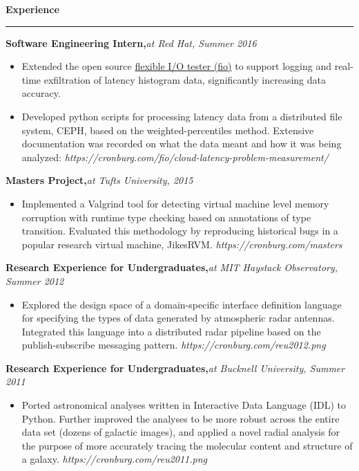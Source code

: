 \documentclass{article}
\begin{document}
{\large\bf Experience}\\[-.3cm]
\rule{\linewidth}{.5pt}
\begin{minipage}{\linewidth}
{\bf Software Engineering Intern,}{\it at Red Hat, Summer 2016}\\[-.4cm]
\begin{itemize}
\item Extended the open source \href{https://github.com/axboe/fio}{flexible I/O tester (fio)}
to support logging and real-time exfiltration of latency histogram data, significantly
increasing data accuracy.
\item Developed python scripts for processing latency data from a distributed
file system, CEPH, based on the weighted-percentiles method. Extensive documentation
was recorded on what the data meant and how it was being analyzed:
{\it https://cronburg.com/fio/cloud-latency-problem-measurement/}
\end{itemize}

{\bf Masters Project,}{\it at Tufts University, 2015}\\[-.4cm]
\begin{itemize}
\item Implemented a Valgrind tool for detecting virtual machine level memory
  corruption with runtime type checking based on annotations of type transition.
  Evaluated this methodology by reproducing historical bugs in a popular
  research virtual machine, JikesRVM. {\it https://cronburg.com/masters}
\end{itemize}

{\bf Research Experience for Undergraduates,}{\it at MIT Haystack Observatory, Summer 2012}\\[-.4cm]
\begin{itemize}
\item Explored the design space of a domain-specific interface definition language for
specifying the types of data generated by atmospheric radar antennas. Integrated this
language into a distributed radar pipeline based on the publish-subscribe messaging
pattern. {\it https://cronburg.com/reu2012.png}
\end{itemize}

{\bf Research Experience for Undergraduates,}{\it at Bucknell University, Summer 2011}\\[-.4cm]
\begin{itemize}
\item Ported astronomical analyses written in Interactive Data Language (IDL) to Python.
  Further improved the analyses to be more robust across the entire data set (dozens of
  galactic images), and applied a novel radial analysis for the purpose of more accurately
  tracing the molecular content and structure of a galaxy. {\it https://cronburg.com/reu2011.png}
\end{itemize}


\end{minipage}
\end{document}
